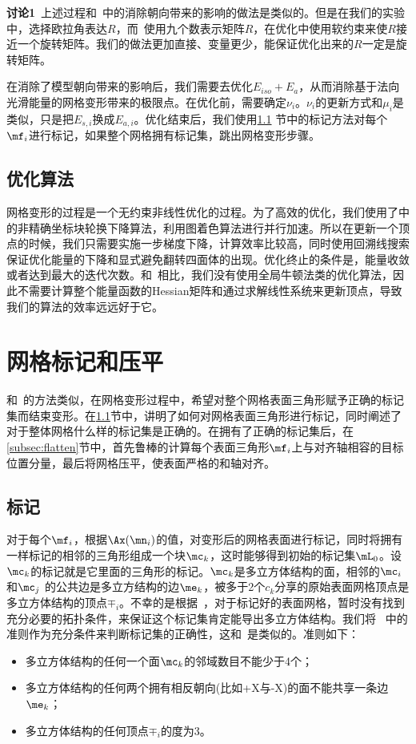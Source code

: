 \textbf{讨论1}\, 上述过程和~\cite{Huang2014}中的消除朝向带来的影响的做法是类似的。但是在我们的实验中，选择欧拉角表达$R$，而~\cite{Huang2014}使用九个数表示矩阵$R$，在优化中使用软约束来使$R$接近一个旋转矩阵。我们的做法更加直接、变量更少，能保证优化出来的$R$一定是旋转矩阵。

在消除了模型朝向带来的影响后，我们需要去优化$E_{iso} + E_a$，从而消除基于法向光滑能量的网格变形带来的极限点。在优化前，需要确定$\nu_i$。$\nu_i$的更新方式和$\mu_i$是类似，只是把$E_{s, i}$换成$E_{a,i}$。优化结束后，我们使用\ref{subsec:label} 节中的标记方法对每个$\mf_i$进行标记，如果整个网格拥有标记集，跳出网格变形步骤。

\subsection{优化算法} \label{subsec:minimize}
网格变形的过程是一个无约束非线性优化的过程。为了高效的优化，我们使用了\cite{Fu2015}中的非精确坐标块轮换下降算法，利用图着色算法进行并行加速。所以在更新一个顶点的时候，我们只需要实施一步梯度下降，计算效率比较高，同时使用回溯线搜索保证优化能量的下降和显式避免翻转四面体的出现。优化终止的条件是，能量收敛或者达到最大的迭代次数。和~\cite{Huang2014}相比，我们没有使用全局牛顿法类的优化算法，因此不需要计算整个能量函数的Hessian矩阵和通过求解线性系统来更新顶点，导致我们的算法的效率远远好于它。

\section{网格标记和压平} \label{sec:label_and_flatten}
和~\cite{Gregson2011,Livesu2013}的方法类似，在网格变形过程中，希望对整个网格表面三角形赋予正确的标记集而结束变形。在\ref{subsec:label}节中，讲明了如何对网格表面三角形进行标记，同时阐述了对于整体网格什么样的标记集是正确的。在拥有了正确的标记集后，在\ref{subsec:flatten}节中，首先鲁棒的计算每个表面三角形$\mf_i$上与对齐轴相容的目标位置分量，最后将网格压平，使表面严格的和轴对齐。

\subsection{标记} \label{subsec:label}
对于每个$\mf_i$，根据$\Ax(\mn_i)$的值，对变形后的网格表面进行标记，同时将拥有一样标记的相邻的三角形组成一个块$\mc_k$，这时能够得到初始的标记集$\mL_0$。设$\mc_k$的标记就是它里面的三角形的标记。$\mc_k$是多立方体结构的面，相邻的$\mc_i$ 和$\mc_j$ 的公共边是多立方结构的边$\me_k$，被多于2个$c_k$分享的原始表面网格顶点是多立方体结构的顶点$\mp_i$。不幸的是根据~\cite{Eppstein2010}，对于标记好的表面网格，暂时没有找到充分必要的拓扑条件，来保证这个标记集肯定能导出多立方体结构。我们将~\cite{Eppstein2010} 中的准则作为充分条件来判断标记集的正确性，这和~\cite{Livesu2013}是类似的。准则如下：
\begin{itemize}
    \item 多立方体结构的任何一个面$\mc_k$的邻域数目不能少于4个；
    \item 多立方体结构的任何两个拥有相反朝向(比如+X与-X)的面不能共享一条边$\me_k$；
    \item 多立方体结构的任何顶点$\mp_i$的度为3。
\end{itemize}


